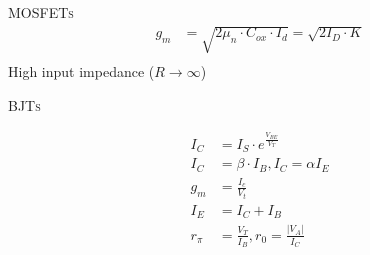 \documentclass[10pt,letterpaper,english]{article}
\begin{document}
\textsc{MOSFETs}\\
\begin{align}
g_m& = \sqrt{2\mu_n \cdot C_{ox} \cdot I_d} = \sqrt{2I_D\cdot K}\\
\end{align}
High input impedance ($R\rightarrow \infty$)


\textsc{BJTs}\\
\begin{multicols}{2}
\begin{align}
I_C&=I_S\cdot e^{\frac{V_{BE}}{V_T}}\\
I_C&= \beta \cdot I_B, I_C = \alpha I_E\\
g_m& = \frac{I_c}{V_t}\\
I_E&= I_C + I_B\\
r_\pi&= \frac{V_T}{I_B}, r_0 = \frac{|V_A|}{I_C}
\end{align}
\end{multicols}
\end{document}
